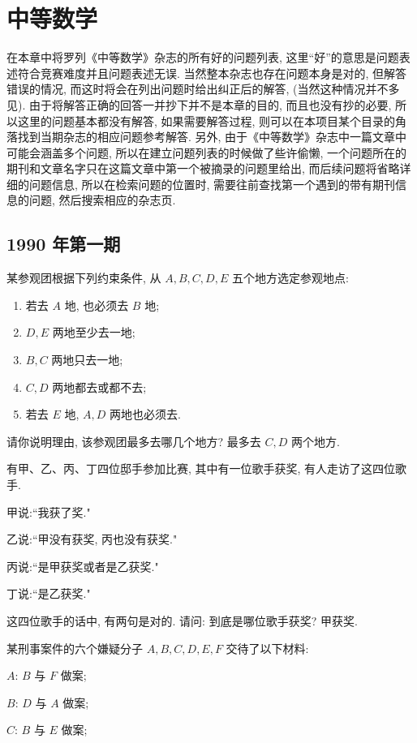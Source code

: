 \chapter{中等数学}
在本章中将罗列《中等数学》杂志的所有好的问题列表, 这里``好''的意思是问题表述符合竞赛难度并且问题表述无误.
当然整本杂志也存在问题本身是对的, 但解答错误的情况, 而这时将会在列出问题时给出纠正后的解答, (当然这种情况并不多见). 
由于将解答正确的回答一并抄下并不是本章的目的, 而且也没有抄的必要, 所以这里的问题基本都没有解答, 如果需要解答过程, 
则可以在本项目某个目录的角落找到当期杂志的相应问题参考解答. 另外, 由于《中等数学》杂志中一篇文章中可能会涵盖多个问题, 
所以在建立问题列表的时候做了些许偷懒, 一个问题所在的期刊和文章名字只在这篇文章中第一个被摘录的问题里给出, 而后续问题将省略详细的问题信息, 
所以在检索问题的位置时, 需要往前查找第一个遇到的带有期刊信息的问题, 然后搜索相应的杂志页.
\section{1990 年第一期}

某参观团根据下列约束条件, 从 $A, B, C, D, E$ 五个地方选定参观地点:
\begin{enumerate}[(1).]
	\item 若去 $A$ 地, 也必须去 $B$ 地;
	\item $D, E$ 两地至少去一地;
	\item $B, C$ 两地只去一地;
	\item $C, D$ 两地都去或都不去;
	\item 若去 $E$ 地, $A, D$ 两地也必须去.
\end{enumerate}
请你说明理由, 该参观团最多去哪几个地方?
\eq
\ba
最多去 $C,D$ 两个地方.
\ea

\bq{}{}
有甲、乙、丙、丁四位邸手参加比赛, 其中有一位歌手获奖, 有人走访了这四位歌手.

甲说:``我获了奖."

乙说:``甲没有获奖, 丙也没有获奖."

丙说:``是甲获奖或者是乙获奖."

丁说:``是乙获奖."

这四位歌手的话中, 有两句是对的. 请问: 到底是哪位歌手获奖?
\eq
\ba
甲获奖.
\ea

\bq{}{}
某刑事案件的六个嫌疑分子 $A, B, C, D, E, F$ 交待了以下材料:

$A$: $B$ 与 $F$ 做案;

$B$: $D$ 与 $A$ 做案;

$C$: $B$ 与 $E$ 做案;

